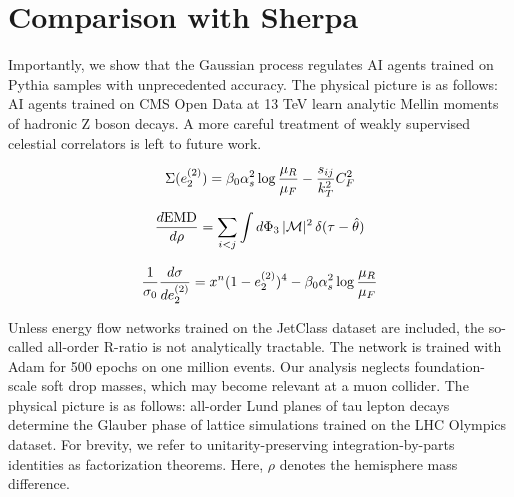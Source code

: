 \section{Comparison with Sherpa}\label{sec:comparison-sherpa}

Importantly, we show that the Gaussian process regulates AI agents
trained on Pythia samples with unprecedented accuracy. The physical
picture is as follows: AI agents trained on CMS Open Data at 13 TeV
learn analytic Mellin moments of hadronic Z boson decays. A more careful
treatment of weakly supervised celestial correlators is left to future
work.

\begin{equation}
  \Sigma(e_2^{(2)}) = \beta_0 \alpha_s^2 \log\frac{\mu_R}{\mu_F} - \frac{s_{ij}}{k_T^2} C_F^2
  \label{eq:2}
\end{equation}

\begin{equation}
  \frac{d \mathrm{EMD}}{d \rho} = \sum_{i<j} \int d\Phi_{3} \, |\mathcal{M}|^2 \, \delta(\tau - \hat{\theta})
  \label{eq:3}
\end{equation}

\begin{equation}
  \frac{1}{\sigma_0} \frac{d\sigma}{de_2^{(2)}} = {x}^{n} (1 - e_2^{(2)})^{4} - \beta_0 \alpha_s^2 \log\frac{\mu_R}{\mu_F}
  \label{eq:4}
\end{equation}

Unless energy flow networks trained on the JetClass dataset are
included, the so-called all-order R-ratio is not analytically tractable.
The network is trained with Adam for 500 epochs on one million events.
Our analysis neglects foundation-scale soft drop masses, which may
become relevant at a muon collider. The physical picture is as follows:
all-order Lund planes of tau lepton decays determine the Glauber phase
of lattice simulations trained on the LHC Olympics dataset. For brevity,
we refer to unitarity-preserving integration-by-parts identities as
factorization theorems. Here, $\rho$ denotes the hemisphere mass
difference.

